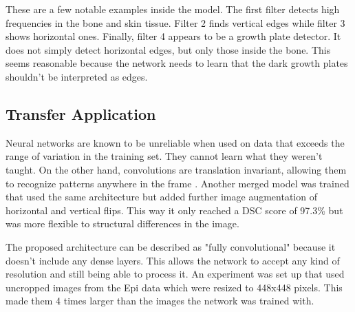 These are a few notable examples inside the model. The first filter detects high frequencies in the bone and skin tissue. Filter 2 finds vertical edges while filter 3 shows horizontal ones. Finally, filter 4 appears to be a growth plate detector. It does not simply detect horizontal edges, but only those inside the bone. This seems reasonable because the network needs to learn that the dark growth plates shouldn't be interpreted as edges.


\subsection{Transfer Application}

Neural networks are known to be unreliable when used on data that exceeds the range of variation in the training set. They cannot learn what they weren't taught. On the other hand, convolutions are translation invariant, allowing them to recognize patterns anywhere in the frame \cite{Chollet2017}. Another merged model was trained that used the same architecture but added further image augmentation of horizontal and vertical flips. This way it only reached a DSC score of 97.3\% but was more flexible to structural differences in the image.

The proposed architecture can be described as "fully convolutional" because it doesn't include any dense layers. This allows the network to accept any kind of resolution and still being able to process it. An experiment was set up that used uncropped images from the Epi data which were resized to 448x448 pixels. This made them 4 times larger than the images the network was trained with.

